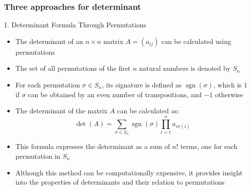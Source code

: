 \documentclass[fullscreen=true, bookmarks=true, hyperref={pdfencoding=unicode}]{beamer}
\begin{document}
\begin{frame}
  \frametitle{Three approaches for determinant}
  \begin{center}
  \end{center}
\end{frame}


\begin{frame}{1. Determinant Formula Through Permutations}
  \begin{itemize}
    \item The determinant of an $n \times n$ matrix $A = (a_{ij})$ can be calculated using permutations
    \item The set of all permutations of the first $n$ natural numbers is denoted by $S_n$
    \pause
    \item For each permutation $\sigma \in S_n$, its signature is defined 
    as $\operatorname{sgn}(\sigma)$, which is $1$ if $\sigma$ 
    can be obtained by an even number of transpositions, and $-1$ otherwise
    \item The determinant of the matrix $A$ can be calculated as:
    \[
      \det(A) = \sum_{\sigma \in S_n} \operatorname{sgn}(\sigma) 
      \prod_{i=1}^n a_{i\sigma(i)}
    \]
    \pause
    \item This formula expresses the determinant as a sum of $n!$ terms, one for each permutation in $S_n$
    \item Although this method can be computationally expensive, 
    it provides insight into the properties of determinants 
    and their relation to permutations
  \end{itemize}
\end{frame}
\end{document}
